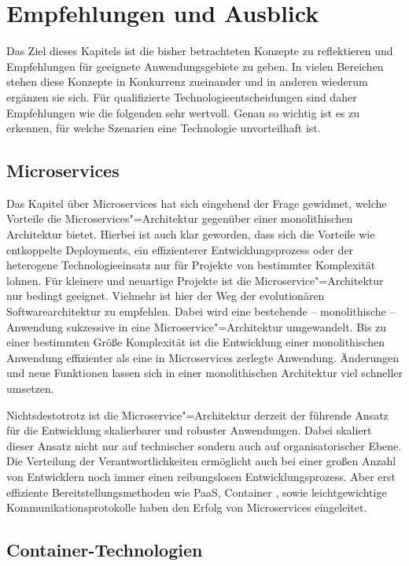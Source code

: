 \chapter{Empfehlungen und Ausblick}

Das Ziel dieses Kapitels ist die bisher betrachteten Konzepte zu reflektieren und Empfehlungen für geeignete Anwendungsgebiete zu geben. In vielen Bereichen stehen diese Konzepte in Konkurrenz zueinander und in anderen wiederum ergänzen sie sich. Für qualifizierte Technologieentscheidungen sind daher Empfehlungen wie die folgenden sehr wertvoll. Genau so wichtig ist es zu erkennen, für welche Szenarien eine Technologie unvorteilhaft ist.

\section{Microservices}

Das Kapitel über Microservices hat sich eingehend der Frage gewidmet, welche Vorteile die Microservices"=Architektur gegenüber einer monolithischen Architektur bietet. Hierbei ist auch klar geworden, dass sich die Vorteile wie entkoppelte Deployments, ein effizienterer Entwicklungsprozess oder der heterogene Technologieeinsatz nur für Projekte von bestimmter Komplexität lohnen. Für kleinere und neuartige Projekte ist die Microservice"=Architektur nur bedingt geeignet. Vielmehr ist hier der Weg der evolutionären Softwarearchitektur zu empfehlen. Dabei wird eine bestehende -- \zB monolithische -- Anwendung sukzessive in eine Microservice"=Architektur umgewandelt. Bis zu einer bestimmten Größe \bzw Komplexität ist die Entwicklung einer monolithischen Anwendung effizienter als eine in Microservices zerlegte Anwendung. Änderungen und neue Funktionen lassen sich in einer monolithischen Architektur viel schneller umsetzen.

Nichtsdestotrotz ist die Microservice"=Architektur derzeit der führende Ansatz für die Entwicklung skalierbarer und robuster Anwendungen. Dabei skaliert dieser Ansatz nicht nur auf technischer sondern auch auf organisatorischer Ebene. Die Verteilung der Verantwortlichkeiten ermöglicht auch bei einer großen Anzahl von Entwicklern noch immer einen reibungslosen Entwicklungsprozess. Aber erst effiziente Bereitstellungsmethoden wie PaaS, Container \ua, sowie leichtgewichtige Kommunikationsprotokolle haben den Erfolg von Microservices eingeleitet.

\section{Container-Technologien}

